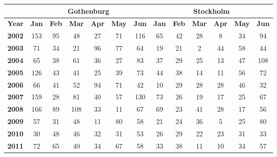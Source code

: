 \documentclass[a4paper,9pt,fleqn]{article}
\begin{document}
\begin{table}   
\centering
\scriptsize
\def\arraystretch{1.1}              
\begin{tabularx}{14cm}{X|cccccc|cccccc}
              & \multicolumn{6}{c|}{\bf Gothenburg}                                   & \multicolumn{6}{c}{\bf Stockholm}                                    \\ \hline
{\bf Year}    & {\bf Jan} & {\bf Feb} & {\bf Mar} & {\bf Apr} & {\bf May} & {\bf Jun} & {\bf Jan} & {\bf Feb} & {\bf Mar} & {\bf Apr} & {\bf May} & {\bf Jun} \\ \hline
{\bf 2002}    & 153       & 95        & 48        & 27        & 71        & 116       & 65        & 42        & 28        & 8         & 34        & 94        \\
{\bf 2003}    & 71        & 34        & 21        & 96        & 77        & 64        & 19        & 21        & 2         & 44        & 58        & 44        \\
{\bf 2004}    & 65        & 38        & 61        & 36        & 27        & 83        & 37        & 29        & 25        & 13        & 47        & 108       \\
{\bf 2005}    & 126       & 43        & 41        & 25        & 39        & 73        & 44        & 38        & 14        & 11        & 56        & 72        \\
{\bf 2006}    & 66        & 41        & 52        & 94        & 71        & 42        & 10        & 29        & 28        & 28        & 46        & 32        \\
{\bf 2007}    & 159       & 28        & 81        & 40        & 57        & 130       & 73        & 26        & 19        & 17        & 25        & 67        \\
{\bf 2008}    & 166       & 89        & 108       & 33        & 11        & 67        & 69        & 23        & 41        & 28        & 17        & 56        \\
{\bf 2009}    & 57        & 31        & 48        & 11        & 80        & 58        & 21        & 24        & 36        & 5         & 25        & 80        \\
{\bf 2010}    & 30        & 48        & 46        & 32        & 31        & 53        & 26        & 29        & 22        & 23        & 31        & 33        \\
{\bf 2011}    & 72        & 65        & 40        & 34        & 67        & 58        & 33        & 38        & 11        & 10        & 34        & 57        \\

\end{tabularx}
\end{table}
\end{document}
